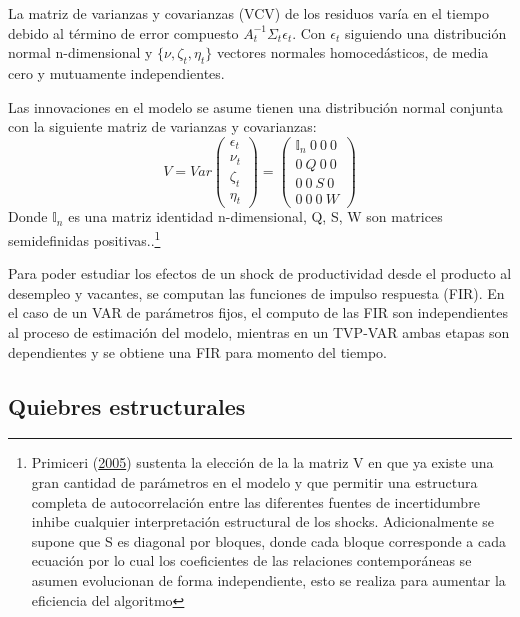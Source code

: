 \documentclass[12pt,oneside]{reedthesis}
\begin{document}
La matriz de varianzas y covarianzas (VCV) de los residuos varía en el tiempo debido al término de error compuesto \(A_t^{-1}\Sigma_t\epsilon_t\). Con \(\epsilon_t\) siguiendo una distribución normal n-dimensional y \(\{\nu, \zeta_t, \eta_t\}\) vectores normales homocedásticos, de media cero y mutuamente independientes.

Las innovaciones en el modelo se asume tienen una distribución normal conjunta con la siguiente matriz de varianzas y covarianzas:
\begin{equation}
V = Var 
\begin{pmatrix} 
\epsilon_t \\\nu_t \\ \zeta_t \\ \eta_t 
\end{pmatrix} =
\begin{pmatrix}
\mathbb{I}_n \ 0 \ 0 \ 0\\
0 \ Q \ 0 \ 0 \\
0 \ 0 \ S \ 0 \\
0\ 0\ 0\ W
\end{pmatrix}
\end{equation}
Donde \(\mathbb{I}_n\) es una matriz identidad n-dimensional, Q, S, W son matrices semidefinidas positivas..\footnote{Primiceri (\protect\hyperlink{ref-Primiceri2005}{2005}) sustenta la elección de la la matriz V en que ya existe una gran cantidad de parámetros en el modelo y que permitir una estructura completa de autocorrelación entre las diferentes fuentes de incertidumbre inhibe cualquier interpretación estructural de los shocks. Adicionalmente se supone que S es diagonal por bloques, donde cada bloque corresponde a cada ecuación por lo cual los coeficientes de las relaciones contemporáneas se asumen evolucionan de forma independiente, esto se realiza para aumentar la eficiencia del algoritmo}

Para poder estudiar los efectos de un shock de productividad desde el producto al desempleo y vacantes, se computan las funciones de impulso respuesta (FIR). En el caso de un VAR de parámetros fijos, el computo de las FIR son independientes al proceso de estimación del modelo, mientras en un TVP-VAR ambas etapas son dependientes y se obtiene una FIR para momento del tiempo.

\hypertarget{quiebres-estructurales}{%
\subsection{Quiebres estructurales}\label{quiebres-estructurales}}
\end{document}
